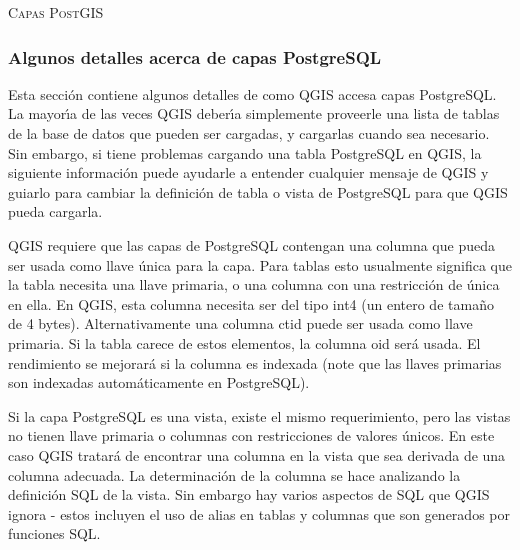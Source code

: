 \begin{Tip}\caption{\textsc{Capas PostGIS}}
\end{Tip}

\subsubsection{Algunos detalles acerca de capas PostgreSQL}\label{sec:postgis_details}

Esta secci\'on contiene algunos detalles de como QGIS accesa capas PostgreSQL. La mayor\'{\i}a de las veces QGIS deber\'{\i}a simplemente proveerle una lista de tablas de la base de datos que pueden ser cargadas, y cargarlas cuando sea necesario. Sin embargo, si tiene problemas cargando una tabla PostgreSQL en QGIS, la siguiente informaci\'on puede ayudarle a entender cualquier mensaje de QGIS y guiarlo para cambiar la definici\'on de tabla o vista de PostgreSQL para que QGIS pueda cargarla.

QGIS requiere que las capas de PostgreSQL contengan una columna que pueda ser usada como llave \'unica para la capa. Para tablas esto usualmente significa que la tabla necesita una llave primaria, o una columna con una restricci\'on de \'unica en ella. En QGIS, esta columna necesita ser del tipo int4 (un entero de tama\~no de 4 bytes). Alternativamente una columna ctid puede ser usada como llave primaria. Si la tabla carece de estos elementos, la columna oid ser\'a usada. El rendimiento se mejorar\'a si la columna es indexada (note que las llaves primarias son indexadas autom\'aticamente en PostgreSQL). 

Si la capa PostgreSQL es una vista, existe el mismo requerimiento, pero las vistas no tienen llave primaria o columnas con restricciones de valores \'unicos. En este caso QGIS tratar\'a de encontrar una columna en la vista que sea derivada de una columna adecuada. La determinaci\'on de la columna se hace analizando la definici\'on SQL de la vista. Sin embargo hay varios aspectos de SQL que QGIS ignora - estos incluyen el uso de alias en tablas y columnas que son generados por funciones SQL.

